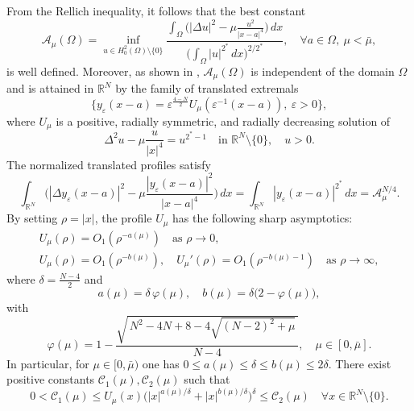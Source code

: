 \documentclass[reqno]{amsart}
\begin{document}
From the Rellich inequality, it follows that the best constant
\begin{equation}\label{A}
\mathcal{A}_{\mu}(\Omega)
=\inf_{u\in H^2_0(\Omega)\setminus\{0\}}
\frac{\int_{\Omega}\Big(|\Delta u|^2-\mu\frac{u^2}{|x-a|^4}\Big)\,dx}
{\Big(\int_{\Omega}|u|^{2^*}\,dx\Big)^{2/2^*}},\quad \forall a\in\Omega,\ \mu<\bar\mu,
\end{equation}
is well defined.
Moreover, as shown in \cite{j1,K}, \(\mathcal{A}_\mu(\Omega)\) is independent of the
domain \(\Omega\) and is attained in \(\mathbb{R}^N\) by the family of translated
extremals
\[
\{y_{\varepsilon}(x-a)=\varepsilon^{\frac{4-N}{2}}
U_{\mu}(\varepsilon^{-1}(x-a)), \ \varepsilon>0\},
\]
where \(U_\mu\) is a positive, radially symmetric, and radially decreasing solution
of
\[
\Delta^2 u-\mu\frac{u}{|x|^4}=u^{2^*-1}\quad\text{in }\mathbb{R}^N\setminus\{0\},
\quad u>0.
\]
The normalized translated profiles satisfy
\[
\int_{\mathbb{R}^N}\Big(|\Delta y_{\varepsilon}(x-a)|^{2}
-\mu\frac{|y_{\varepsilon}(x-a)|^{2}}{|x-a|^{4}}\Big)\,dx
=\int_{\mathbb{R}^N}|y_{\varepsilon}(x-a)|^{2^*}\,dx
=\mathcal{A}_{\mu}^{N/4}.
\]
By setting \(\rho=|x|\), the profile \(U_\mu\) has the following sharp
asymptotics:
\begin{gather*}
U_\mu(\rho) = O_1(\rho^{-a(\mu)}) \quad\text{as }\rho \to 0,\\
U_\mu(\rho) = O_1(\rho^{-b(\mu)}), \quad
U_\mu'(\rho) = O_1(\rho^{-b(\mu)-1}) \quad\text{as }\rho \to \infty,
\end{gather*}
where \( \delta=\tfrac{N-4}{2}\) and
\[
a(\mu)=\delta\,\varphi(\mu),\quad b(\mu)=\delta\big(2-\varphi(\mu)\big),
\]
with
\[
\varphi(\mu)=1-\frac{\sqrt{\,N^2-4N+8-4\sqrt{(N-2)^2+\mu}\,}}{N-4},\quad
\mu\in[0,\bar\mu].
\]
In particular, for \(\mu\in[0,\bar\mu)\) one has
\(0\le a(\mu)\le\delta\le b(\mu)\le 2\delta\). There exist positive constants
\(\mathcal{C}_1(\mu),\mathcal{C}_2(\mu)\) such that
\[
0<\mathcal{C}_1(\mu)\le U_\mu(x)\big(|x|^{a(\mu)/\delta}+|x|^{b(\mu)/\delta}\big)^\delta\le\mathcal{C}_2(\mu)
\quad\forall x\in\mathbb{R}^N\setminus\{0\}.
\]
\end{document}
